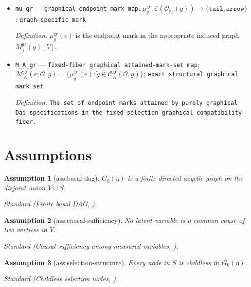 \documentclass{article}
\newtheorem{assumption}{Assumption}
\begin{document}
\begin{itemize}
  \par\smallskip\noindent\emph{Definition.} The fiber of Dai graphical specifications with \(A_{\mathrm{gr}}\) equal to that of \(g\) and full graphical signature equal to \(\mathcal O\).
  \item \texttt{mu\_\allowbreak{}gr} --- \texttt{graphical endpoint-\allowbreak{}mark map}; \(\mu_g^{\mathrm{gr}}:\mathcal E(\mathcal O_{\mathrm{gr}}(g))\to\{\mathtt{tail},\mathtt{arrow}\}\); \texttt{graph-\allowbreak{}specific mark}
  \par\smallskip\noindent\emph{Definition.} \(\mu_g^{\mathrm{gr}}(e)\) is the endpoint mark in the appropriate induced graph \(M_j^{\mathrm{gr}}(g)[V]\).
  \item \texttt{M\_\allowbreak{}A\_\allowbreak{}gr} --- \texttt{fixed-\allowbreak{}fiber graphical attained-\allowbreak{}mark-\allowbreak{}set map}; \(\mathcal M_A^{\mathrm{gr}}(e;\mathcal O,g)=\{\mu_{\widetilde g}^{\mathrm{gr}}(e):\widetilde g\in\mathcal C_A^{\mathrm{gr}}(\mathcal O,g)\}\); \texttt{exact structural graphical mark set}
  \par\smallskip\noindent\emph{Definition.} \texttt{The set of endpoint marks attained by purely graphical Dai specifications in the fixed-\allowbreak{}selection graphical compatibility fiber.}
\end{itemize}

\section{Assumptions}

\begin{assumption}[ass:basal-dag]\label{ass:basal-dag}
\(G_0(\eta)\) is a finite directed acyclic graph on the disjoint union \(V\cup S\).
\par\smallskip\noindent\emph{Standard} (Finite basal DAG, \cite{DaiEtAl2025SelectionIntervention}).
\end{assumption}

\begin{assumption}[ass:causal-sufficiency]\label{ass:causal-sufficiency}
No latent variable is a common cause of two vertices in \(V\).
\par\smallskip\noindent\emph{Standard} (Causal sufficiency among measured variables, \cite{DaiEtAl2025SelectionIntervention}).
\end{assumption}

\begin{assumption}[ass:selection-structure]\label{ass:selection-structure}
Every node in \(S\) is childless in \(G_0(\eta)\).
\par\smallskip\noindent\emph{Standard} (Childless selection nodes, \cite{DaiEtAl2025SelectionIntervention}).
\end{assumption}
\end{document}
